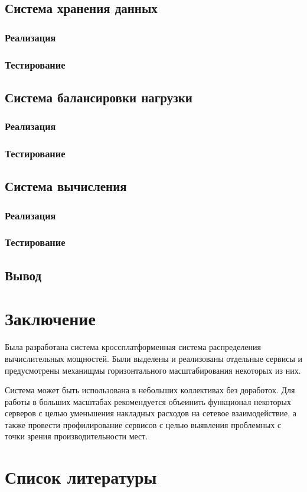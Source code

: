 \documentclass[a4paper,12pt]{report}
\numberwithin{equation}{section}
\begin{document}
  \subsection{Система хранения данных}
  \subsubsection{Реализация}
  
  \subsubsection{Тестирование}
  
  \subsection{Система балансировки нагрузки}
  \subsubsection{Реализация}
  
  \subsubsection{Тестирование}
  
  \subsection{Система вычисления}
  \subsubsection{Реализация}
  
  \subsubsection{Тестирование}
  
  \subsection{Вывод}
  
  \clearpage
  \section{Заключение}
  Была разработана система кроссплатформенная система распределения вычислительных мощностей. Были выделены  и реализованы отдельные сервисы и предусмотрены механищмы горизонтального масштабирования некоторых из них. 
  
  Система может быть использована в небольших коллективах без доработок.
  Для работы в больших масштабах рекомендуется объеинить функционал некоторых серверов с целью уменьшения накладных расходов на сетевое взаимодействие, а также провести профилирование сервисов с целью выявления проблемных с точки зрения производительности мест.
  
  \section{Список литературы}
  \printbibliography[heading=none]  
  
\end{document}
